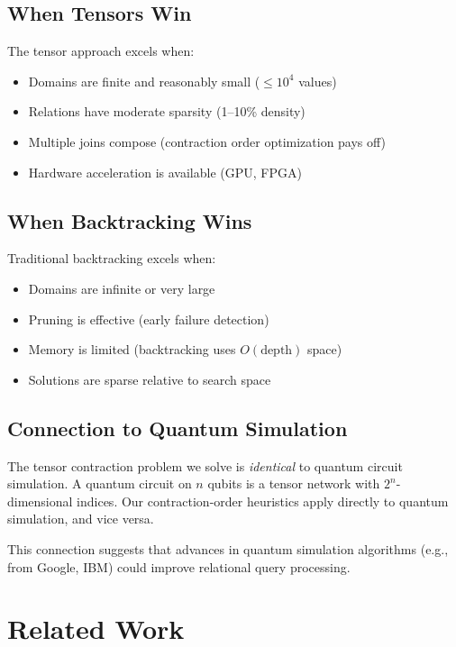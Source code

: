 \documentclass[11pt,a4paper]{article}
\begin{document}
\subsection{When Tensors Win}

The tensor approach excels when:
\begin{itemize}
  \item Domains are finite and reasonably small ($\leq 10^4$ values)
  \item Relations have moderate sparsity (1--10\% density)
  \item Multiple joins compose (contraction order optimization pays off)
  \item Hardware acceleration is available (GPU, FPGA)
\end{itemize}

\subsection{When Backtracking Wins}

Traditional backtracking excels when:
\begin{itemize}
  \item Domains are infinite or very large
  \item Pruning is effective (early failure detection)
  \item Memory is limited (backtracking uses $O(\text{depth})$ space)
  \item Solutions are sparse relative to search space
\end{itemize}

\subsection{Connection to Quantum Simulation}

The tensor contraction problem we solve is \emph{identical} to quantum circuit simulation.
A quantum circuit on $n$ qubits is a tensor network with $2^n$-dimensional indices.
Our contraction-order heuristics apply directly to quantum simulation, and vice versa.

This connection suggests that advances in quantum simulation algorithms
(e.g., from Google, IBM) could improve relational query processing.

\section{Related Work}
\label{sec:related_chirho}
\end{document}
